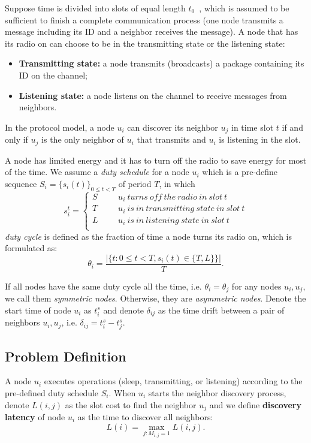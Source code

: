 Suppose time is divided into slots of equal length $t_0$~\cite{van2004lightweight}, 
which is assumed to be sufficient to finish a complete
communication process (one node transmits a message including its ID and
a neighbor receives the message).
A node that has its radio on can choose to be in the transmitting state
or the listening state:
\begin{itemize}
\item \textbf{Transmitting state:} a node transmits (broadcasts) a package containing its ID on the channel;
\item  \textbf{Listening state:} a node listens on the channel to receive messages from neighbors.
\end{itemize}
In the protocol model, a node $u_i$ can discover its neighbor $u_j$ in
time slot $t$ if and only if $u_j$ is the only neighbor of $u_i$ that
transmits and $u_i$ is listening in the slot.

A node has limited energy and it has to turn off the radio to save
energy for most of the time. We assume a \emph{duty schedule} for a node
$u_i$ which is a pre-define sequence $S_i=\{s_i(t)\}_{0\leq t<T}$ of period
$T$, in which
$$ s_i^t=\left\{
\begin{aligned}
S  & & & {u_i ~turns~ off~ the~ radio~ in~ slot~ t}  	 \\
T  & & & {u_i ~is~ in~ transmitting~ state~ in~ slot~ t}	\\
L  & & & {u_i ~is~ in~ listening~ state~ in~ slot~ t}	\\
\end{aligned}
\right.
$$
 \emph{duty cycle} is defined as the fraction of time a node turns its radio on, which is formulated as:
$$\theta_i=\frac{|\{t: 0\leq t<T, s_i(t) \in \{T,L\}\}|}{T}.
$$

If all nodes have the same duty cycle all the time, i.e. $\theta_i =
\theta_j$ for any nodes $u_i, u_j$, we call them \emph{symmetric nodes}.
Otherwise, they are \emph{asymmetric nodes}. Denote the start time of
node $u_i$ as $t_i^s$ and denote $\delta_{ij}$ as the time drift between
a pair of neighbors $u_i, u_j$, i.e. $\delta_{ij} = t_i^s - t_j^s$.

\subsection{Problem Definition}

A node $u_i$ executes operations (sleep, transmitting, or
listening) according to the pre-defined duty schedule $S_i$.
When $u_i$ starts the neighbor discovery process, denote $L(i,j)$ as the
slot cost to find the neighbor $u_j$ and we define \textbf{discovery
latency} of node $u_i$ as the time to discover all neighbors:
$$L(i) = \max_{j:M_{i,j}=1} L(i,j).
$$

